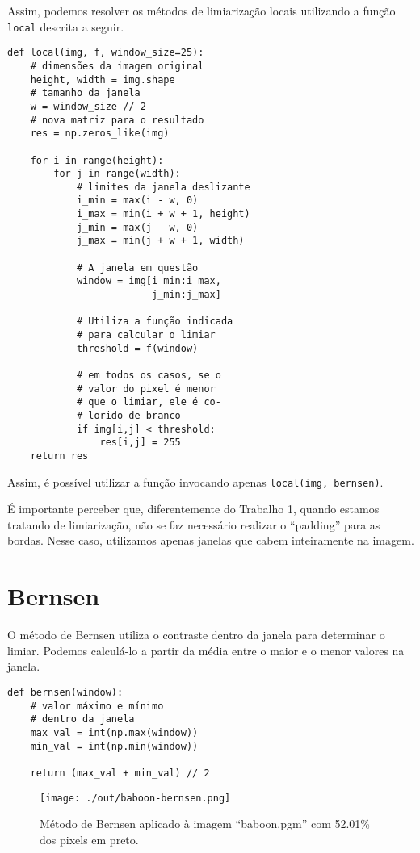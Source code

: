 \documentclass[twocolumn, 10pt]{article}
\begin{document}
Assim, podemos resolver os métodos de limiarização locais utilizando a função \texttt{local} descrita a seguir.
\begin{verbatim}
def local(img, f, window_size=25):
    # dimensões da imagem original
    height, width = img.shape
    # tamanho da janela
    w = window_size // 2
    # nova matriz para o resultado
    res = np.zeros_like(img)

    for i in range(height):
        for j in range(width):
            # limites da janela deslizante
            i_min = max(i - w, 0)
            i_max = min(i + w + 1, height)
            j_min = max(j - w, 0)
            j_max = min(j + w + 1, width)

            # A janela em questão
            window = img[i_min:i_max,
                         j_min:j_max]

            # Utiliza a função indicada
            # para calcular o limiar
            threshold = f(window)

            # em todos os casos, se o
            # valor do pixel é menor
            # que o limiar, ele é co-
            # lorido de branco
            if img[i,j] < threshold:
                res[i,j] = 255
    return res
\end{verbatim}
Assim, é possível utilizar a função invocando apenas \texttt{local(img, bernsen)}.

É importante perceber que, diferentemente do Trabalho 1, quando estamos tratando de limiarização, não se faz necessário realizar o ``padding'' para as bordas.
Nesse caso, utilizamos apenas janelas que cabem inteiramente na imagem.
\section*{Bernsen}
\label{sec:org8cc2694}
O método de Bernsen utiliza o contraste dentro da janela para determinar o limiar.
Podemos calculá-lo a partir da média entre o maior e o menor valores na janela.
\begin{verbatim}
def bernsen(window):
    # valor máximo e mínimo
    # dentro da janela
    max_val = int(np.max(window))
    min_val = int(np.min(window))

    return (max_val + min_val) // 2
\end{verbatim}
\begin{figure}[htbp]
\centering
\texttt{[image: ./out/baboon-bernsen.png]}
\caption{Método de Bernsen aplicado à imagem ``baboon.pgm'' com 52.01\% dos pixels em preto.}
\end{figure}
\end{document}
